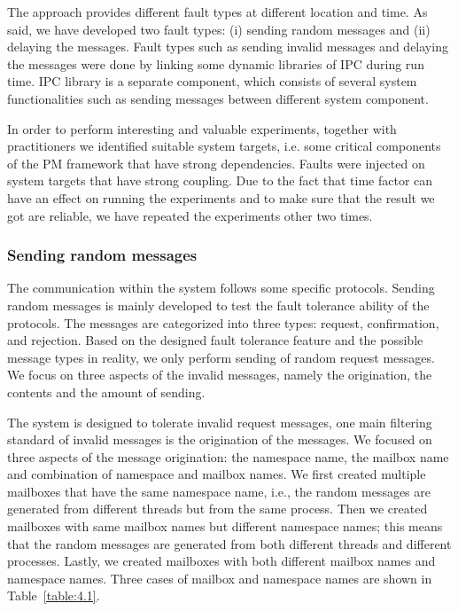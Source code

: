 The \approach{} approach provides different fault types at different location and time. As said, we have developed two fault types: (i) sending random messages and (ii) delaying the messages. Fault types such as sending invalid messages and delaying the messages were done by linking some dynamic libraries of IPC during run time. IPC library is a separate component, which consists of several system functionalities such as sending  messages between different system component.

In order to perform interesting and valuable experiments, together with practitioners we identified suitable system targets, i.e.  
some critical components of the PM framework that have strong dependencies. Faults were injected on system targets that have strong coupling. Due to the fact that time factor can have an effect on running the experiments and to make sure that the result we got are reliable, we have repeated the experiments other two times. %

\subsubsection{Sending random messages}
The communication within the system follows some specific protocols.  Sending random messages is mainly developed to test the fault tolerance ability of the protocols. The messages are categorized into three types: request, confirmation, and rejection.  Based on the designed fault tolerance feature and the possible message types in reality, we only perform sending of random request messages. We focus on three aspects of the invalid messages, namely the origination, the contents and the amount of sending.

The system is designed to tolerate invalid request messages, one main filtering standard of invalid messages is the origination of the messages. We focused on three aspects of the message origination: the namespace name, the mailbox name and combination of namespace and mailbox names. We first created multiple mailboxes that have the same namespace name, i.e., the random messages are generated from different threads but from the same process. Then we created mailboxes with same mailbox names but different namespace names; this means that the random messages are generated from both different threads and different processes. Lastly, we created mailboxes with both different mailbox names and namespace names. Three cases of mailbox and namespace names are shown in Table~\ref{table:4.1}.


